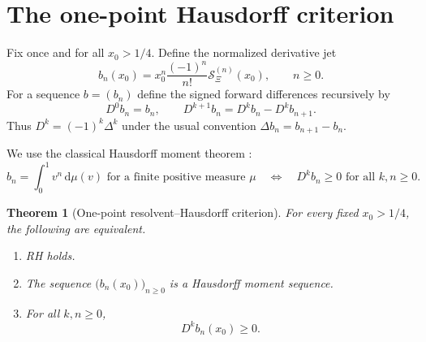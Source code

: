 \documentclass[11pt]{article}
\newtheorem{theorem}{Theorem}[section]
\theoremstyle{definition}
\newcommand{\XiR}{\mathcal S_{\Xi}}
\newcommand{\dd}{\,\mathrm d}
\begin{document}
\section{The one-point Hausdorff criterion}

Fix once and for all $x_0>1/4$. Define the normalized derivative jet
\begin{equation}\label{eq:bn-def}
 b_n(x_0)=x_0^n\frac{(-1)^n}{n!}\XiR^{(n)}(x_0),\qquad n\ge0.
\end{equation}
For a sequence $b=(b_n)$ define the signed forward differences recursively by
\[
 D^0b_n=b_n,\qquad D^{k+1}b_n=D^kb_n-D^kb_{n+1}.
\]
Thus $D^k=(-1)^k\Delta^k$ under the usual convention $\Delta b_n=b_{n+1}-b_n$.

We use the classical Hausdorff moment theorem \cite{Hausdorff1921,ShohatTamarkin1943,Akhiezer1965}:
\begin{equation}\label{eq:hausdorff-theorem}
 b_n=\int_0^1 v^n\dd\mu(v)\text{ for a finite positive measure $\mu$}
 \quad\Longleftrightarrow\quad
 D^kb_n\ge0\text{ for all $k,n\ge0$}.
\end{equation}

\begin{theorem}[One-point resolvent--Hausdorff criterion]\label{thm:one-point}
For every fixed $x_0>1/4$, the following are equivalent.
\begin{enumerate}[label=(\alph*)]
  \item RH holds.
  \item The sequence $\bigl(b_n(x_0)\bigr)_{n\ge0}$ is a Hausdorff moment sequence.
  \item For all $k,n\ge0$,
  \[
    D^k b_n(x_0)\ge0.
  \]
\end{enumerate}
\end{theorem}
\end{document}
